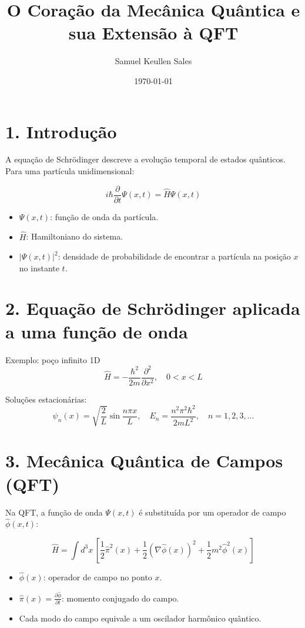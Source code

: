 \documentclass[12pt,a4paper]{article}
\title{O Coração da Mecânica Quântica e sua Extensão à QFT}
\author{Samuel Keullen Sales}
\date{\today}
\begin{document}
\maketitle

\section*{1. Introdução}
A equação de Schrödinger descreve a evolução temporal de estados quânticos. Para uma partícula unidimensional:

\begin{equation}
i \hbar \frac{\partial}{\partial t} \Psi(x,t) = \hat{H} \Psi(x,t)
\end{equation}

\begin{itemize}
    \item \(\Psi(x,t)\): função de onda da partícula.
    \item \(\hat{H}\): Hamiltoniano do sistema.
    \item \(|\Psi(x,t)|^2\): densidade de probabilidade de encontrar a partícula na posição \(x\) no instante \(t\).
\end{itemize}

\section*{2. Equação de Schrödinger aplicada a uma função de onda}
Exemplo: poço infinito 1D
\[
\hat{H} = -\frac{\hbar^2}{2m} \frac{\partial^2}{\partial x^2}, \quad 0 < x < L
\]

Soluções estacionárias:
\[
\psi_n(x) = \sqrt{\frac{2}{L}} \sin\frac{n \pi x}{L}, \quad E_n = \frac{n^2 \pi^2 \hbar^2}{2 m L^2}, \quad n=1,2,3,\dots
\]

\section*{3. Mecânica Quântica de Campos (QFT)}
Na QFT, a função de onda \(\Psi(x,t)\) é substituída por um operador de campo \(\hat{\phi}(x,t)\):

\begin{equation}
\hat{H} = \int d^3x \, \left[ \frac{1}{2} \hat{\pi}^2(x) + \frac{1}{2} (\nabla \hat{\phi}(x))^2 + \frac{1}{2} m^2 \hat{\phi}^2(x) \right]
\end{equation}

\begin{itemize}
    \item \(\hat{\phi}(x)\): operador de campo no ponto \(x\).
    \item \(\hat{\pi}(x) = \frac{\partial \hat{\phi}}{\partial t}\): momento conjugado do campo.
    \item Cada modo do campo equivale a um oscilador harmônico quântico.
\end{itemize}
\end{document}
